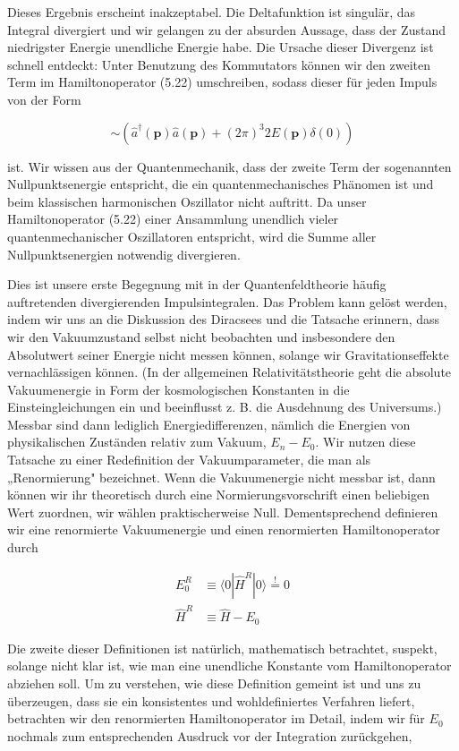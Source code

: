 \documentclass[10pt, letterpaper]{article}
\begin{document}
Dieses Ergebnis erscheint inakzeptabel. Die Deltafunktion ist singulär, das Integral divergiert und wir gelangen zu der absurden Aussage, dass der Zustand niedrigster Energie unendliche Energie habe. Die Ursache dieser Divergenz ist schnell entdeckt: Unter Benutzung des Kommutators können wir den zweiten Term im Hamiltonoperator (5.22) umschreiben, sodass dieser für jeden Impuls von der Form

$$
\sim\left(\hat{a}^{\dagger}(\mathbf{p}) \hat{a}(\mathbf{p})+(2 \pi)^{3} 2 E(\mathbf{p}) \delta(0)\right)
$$

ist. Wir wissen aus der Quantenmechanik, dass der zweite Term der sogenannten Nullpunktsenergie entspricht, die ein quantenmechanisches Phänomen ist und beim klassischen harmonischen Oszillator nicht auftritt. Da unser Hamiltonoperator (5.22) einer Ansammlung unendlich vieler quantenmechanischer Oszillatoren entspricht, wird die Summe aller Nullpunktsenergien notwendig divergieren.

Dies ist unsere erste Begegnung mit in der Quantenfeldtheorie häufig auftretenden divergierenden Impulsintegralen. Das Problem kann gelöst werden, indem wir uns an die Diskussion des Diracsees und die Tatsache erinnern, dass wir den Vakuumzustand selbst nicht beobachten und insbesondere den Absolutwert seiner Energie nicht messen können, solange wir Gravitationseffekte vernachlässigen können. (In der allgemeinen Relativitätstheorie geht die absolute Vakuumenergie in Form der kosmologischen Konstanten in die Einsteingleichungen ein und beeinflusst z. B. die Ausdehnung des Universums.) Messbar sind dann lediglich Energiedifferenzen, nämlich die Energien von physikalischen Zuständen relativ zum Vakuum, $E_{n}-E_{0}$. Wir nutzen diese Tatsache zu einer Redefinition der Vakuumparameter, die man als „Renormierung" bezeichnet. Wenn die Vakuumenergie nicht messbar ist, dann können wir ihr theoretisch durch eine Normierungsvorschrift einen beliebigen Wert zuordnen, wir wählen praktischerweise Null. Dementsprechend definieren wir eine renormierte Vakuumenergie und einen renormierten Hamiltonoperator durch

$$
\begin{aligned}
E_{0}^{R} & \equiv\langle 0| \hat{H}^{R}|0\rangle \stackrel{!}{=} 0 \\
\hat{H}^{R} & \equiv \hat{H}-E_{0}
\end{aligned}
$$

Die zweite dieser Definitionen ist natürlich, mathematisch betrachtet, suspekt, solange nicht klar ist, wie man eine unendliche Konstante vom Hamiltonoperator abziehen soll. Um zu verstehen, wie diese Definition gemeint ist und uns zu überzeugen, dass sie ein konsistentes und wohldefiniertes Verfahren liefert, betrachten wir den renormierten Hamiltonoperator im Detail, indem wir für $E_{0}$ nochmals zum entsprechenden Ausdruck vor der Integration zurückgehen,
\end{document}
